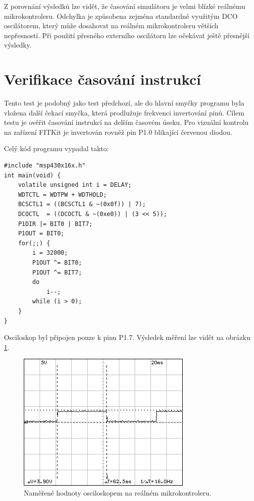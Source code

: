 Z porovnání výsledků lze vidět, že časování simulátoru je velmi blízké reálnému mikrokontroleru. Odchylka je způsobena zejména standardně využitým DCO oscilátorem, který může dosahovat na reálném mikrokontroleru větších nepřesností. Při použití přesného externího oscilátoru lze očekávat ještě přesnější výsledky.

\section{Verifikace časování instrukcí}

Tento test je podobný jako test předchozí, ale do hlavní smyčky programu byla vložena další čekací smyčka, která prodlužuje frekvenci invertování pinů. Cílem testu je ověřit časování instrukcí na delším časovém úseku. Pro vizuální kontrolu na zařízení FITKit je invertován rovněž pin P1.0 blikající červenou diodou.

Celý kód programu vypadal takto:

\lstset{language=XML, numbers=left, frame=single, breaklines=true, tabsize=2, xleftmargin=20pt}
\begin{lstlisting}
#include "msp430x16x.h"
int main(void) {
	volatile unsigned int i = DELAY;
	WDTCTL = WDTPW + WDTHOLD;
	BCSCTL1 = ((BCSCTL1 & ~(0x0f)) | 7);
	DCOCTL  = ((DCOCTL & ~(0xe0)) | (3 << 5));
	P1DIR |= BIT0 | BIT7;
	P1OUT = BIT0;
	for(;;) {
		i = 32000;
		P1OUT ^= BIT0;
		P1OUT ^= BIT7;
		do
			i--;
		while (i > 0);
	}
}
\end{lstlisting}

Osciloskop byl připojen pouze k pinu P1.7. Výsledek měření lze vidět na obrázku \ref{fig:dso05osc}.

\begin{figure}[ht]
\centering
\includegraphics[trim=0cm 0cm 0cm 0cm, scale=1]{fig/dso05}
\caption{Naměřené hodnoty osciloskopem na reálném mikrokontroleru.}
\label{fig:dso05osc}
\end{figure}

